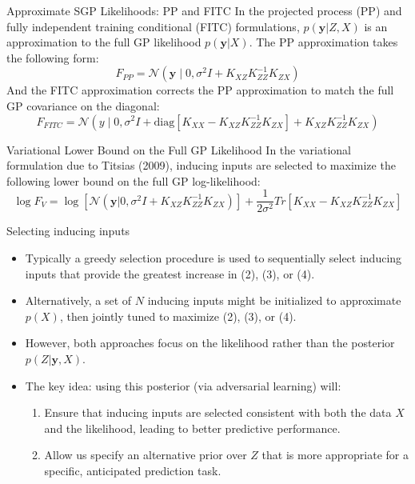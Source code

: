 \documentclass{beamer}
\begin{document}
\begin{frame}{Approximate SGP Likelihoods: PP and FITC}
In the projected process (PP) and fully independent training conditional (FITC) formulations, $p(\mathbf{y} | Z, X)$ is an approximation to the full GP likelihood $p(\mathbf{y} | X)$. The PP approximation takes the following form:
\begin{equation}
F_{PP} = \mathcal{N}(\mathbf{y} \mid 0, \sigma^2 I+K_{XZ}K^{-1}_{ZZ}K_{ZX})
\end{equation}
And the FITC approximation corrects the PP approximation to match the full GP covariance on the diagonal:
\begin{equation}
F_{FITC} = \mathcal{N}(y \mid 0, \sigma^2 I+ \text{diag}[K_{XX} - K_{XZ}K^{-1}_{ZZ}K_{ZX}] + K_{XZ}K^{-1}_{ZZ}K_{ZX})
\end{equation}

\end{frame}

\begin{frame}{Variational Lower Bound on the Full GP Likelihood}
In the variational formulation due to Titsias (2009), inducing inputs are selected to maximize the following lower bound on the full GP log-likelihood:
\begin{equation}
\log F_V = \log [\mathcal{N}(\mathbf{y} | 0, \sigma^2 I+K_{XZ}K^{-1}_{ZZ}K_{ZX})] + \frac{1}{2\sigma^2}Tr[K_{XX} - K_{XZ}K^{-1}_{ZZ}K_{ZX}]
\end{equation}
\end{frame}

\begin{frame}{Selecting inducing inputs}
\begin{itemize}
	\item Typically a greedy selection procedure is used to sequentially select inducing inputs that provide the greatest increase in (2), (3), or (4).
	\item Alternatively, a set of $N$ inducing inputs might be initialized to approximate $p(X)$, then jointly tuned to maximize (2), (3), or (4). 
	\item However, both approaches focus on the likelihood rather than the posterior $p(Z | \mathbf{y}, X)$.
	\item The key idea: using this posterior (via adversarial learning) will: 
	\begin{enumerate}
		\item Ensure that inducing inputs are selected consistent with both the data $X$ and the likelihood, leading to better predictive performance.
		\item Allow us specify an alternative prior over $Z$ that is more appropriate for a specific, anticipated prediction task.
	\end{enumerate}
\end{itemize}
\end{frame}
\end{document}
